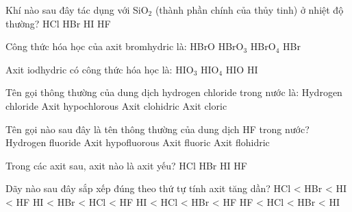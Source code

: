 \documentclass[Main.tex]{subfiles}
\begin{document}
    \begin{ex}
    Khí nào sau đây tác dụng với SiO$_2$ (thành phần chính của thủy tinh) ở nhiệt độ thường?
    \choice
    {HCl}
    {HBr}
    {HI}
    {\True HF}
    \end{ex}
    
    \begin{ex}
    Công thức hóa học của axit bromhydric là:
    \choice
    {HBrO}
    {HBrO$_3$}
    {HBrO$_4$}
    {\True HBr}
    \end{ex}
    
    \begin{ex}
    Axit iodhydric có công thức hóa học là:
    \choice
    {HIO$_3$}
    {HIO$_4$}
    {HIO}
    {\True HI}
    \end{ex}
    
    \begin{ex}
    Tên gọi thông thường của dung dịch hydrogen chloride trong nước là:
    \choice
    {Hydrogen chloride}
    {Axit hypochlorous}
    {\True Axit clohidric}
    {Axit cloric}
    \end{ex}
    
    \begin{ex}
    Tên gọi nào sau đây là tên thông thường của dung dịch HF trong nước?
    \choice
    {Hydrogen fluoride}
    {Axit hypofluorous}
    {Axit fluoric}
    {\True Axit flohidric}
    \end{ex}
    
    \begin{ex}
    Trong các axit sau, axit nào là axit yếu?
    \choice
    {HCl}
    {HBr}
    {HI}
    {\True HF}
    \end{ex}
    
    \begin{ex}
    Dãy nào sau đây sắp xếp đúng theo thứ tự tính axit tăng dần?
    \choice
    {HCl < HBr < HI < HF}
    {HI < HBr < HCl < HF}
    {HI < HCl < HBr < HF}
    {\True HF < HCl < HBr < HI}
    \end{ex}
    
\end{document}
